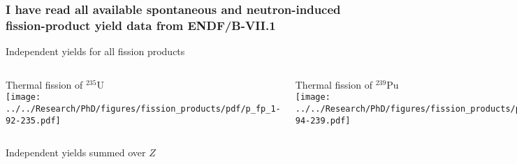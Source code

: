 \documentclass[compress,10pt]{beamer}
\begin{document}
\begin{frame}
    \frametitle{I have read all available spontaneous and neutron-induced fission-product yield data from ENDF/B-VII.1}

    \centering

    \vspace{-4mm}
    {Independent yields for all fission products}

    \begin{columns}[b]


        \centering

        {\footnotesize Thermal fission of $^{235}$U  } \\
        {}\texttt{[image: ../../Research/PhD/figures/fission\_products/pdf/p\_fp\_1-92-235.pdf]} \\


        \centering

        {\footnotesize Thermal fission of $^{239}$Pu  } \\
        {}\texttt{[image: ../../Research/PhD/figures/fission\_products/pdf/p\_fp\_1-94-239.pdf]} \\


        \centering

        {\footnotesize Fast fission of $^{238}$U  } \\
        {}\texttt{[image: ../../Research/PhD/figures/fission\_products/pdf/p\_fp\_2-92-238.pdf]} \\


        \centering

        {\footnotesize SF of $^{246}$Cm  } \\
        {}\texttt{[image: ../../Research/PhD/figures/fission\_products/pdf/p\_fp\_2-96-248.pdf]} \\

    \end{columns}

    \vspace{-1mm}
    {Independent yields summed over $Z$}

    \centering
    \begin{columns}[b]


\end{columns}
\end{frame}
\end{document}

